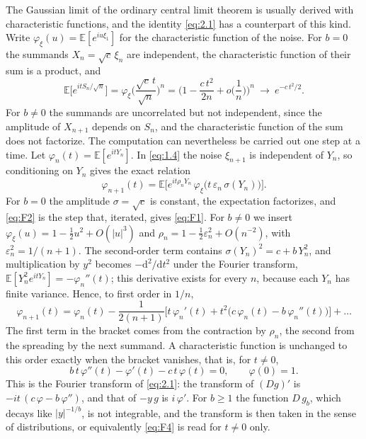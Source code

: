 \documentclass[aip,jmp,preprint,onecolumn,floatfix,superscriptaddress,nofootinbib,11pt]{revtex4-2}
\theoremstyle{plain}
\theoremstyle{remark}
\numberwithin{equation}{section}
\newcommand{\dd}{\mathrm{d}}
\newcommand{\E}{\mathbb{E}}
\newcommand{\eps}{\varepsilon}
\begin{document}
The Gaussian limit of the ordinary central limit theorem is usually derived with characteristic functions, and the identity \eqref{eq:2.1} has a counterpart of this kind. Write $\varphi_\xi(u)=\E[e^{iu\xi_1}]$ for the characteristic function of the noise. For $b=0$ the summands $X_n=\sqrt c\,\xi_n$ are independent, the characteristic function of their sum is a product, and
\begin{equation}
\E\big[e^{itS_n/\sqrt n}\big]=\varphi_\xi\Big(\frac{\sqrt c\,t}{\sqrt n}\Big)^{n}=\Big(1-\frac{c\,t^{2}}{2n}+o\Big(\frac1n\Big)\Big)^{n}\ \longrightarrow\ e^{-c\,t^{2}/2}.
\label{eq:F1}
\end{equation}
For $b\ne0$ the summands are uncorrelated but not independent, since the amplitude of $X_{n+1}$ depends on $S_n$, and the characteristic function of the sum does not factorize. The computation can nevertheless be carried out one step at a time. Let $\varphi_n(t)=\E[e^{itY_n}]$. In \eqref{eq:1.4} the noise $\xi_{n+1}$ is independent of $Y_n$, so conditioning on $Y_n$ gives the exact relation
\begin{equation}
\varphi_{n+1}(t)=\E\Big[e^{it\rho_nY_n}\,\varphi_\xi\big(t\,\eps_n\,\sigma(Y_n)\big)\Big].
\label{eq:F2}
\end{equation}
For $b=0$ the amplitude $\sigma=\sqrt c$ is constant, the expectation factorizes, and \eqref{eq:F2} is the step that, iterated, gives \eqref{eq:F1}. For $b\ne0$ we insert $\varphi_\xi(u)=1-\tfrac12u^{2}+O(|u|^{3})$ and $\rho_n=1-\tfrac12\eps_n^{2}+O(n^{-2})$, with $\eps_n^{2}=1/(n+1)$. The second-order term contains $\sigma(Y_n)^{2}=c+b\,Y_n^{2}$, and multiplication by $y^{2}$ becomes $-\dd^{2}/\dd t^{2}$ under the Fourier transform, $\E[Y_n^{2}e^{itY_n}]=-\varphi_n''(t)$; this derivative exists for every $n$, because each $Y_n$ has finite variance. Hence, to first order in $1/n$,
\begin{equation}
\varphi_{n+1}(t)=\varphi_n(t)-\frac{1}{2(n+1)}\Big[t\,\varphi_n'(t)+t^{2}\big(c\,\varphi_n(t)-b\,\varphi_n''(t)\big)\Big]+\dots
\label{eq:F3}
\end{equation}
The first term in the bracket comes from the contraction by $\rho_n$, the second from the spreading by the next summand. A characteristic function is unchanged to this order exactly when the bracket vanishes, that is, for $t\ne0$,
\begin{equation}
b\,t\,\varphi''(t)-\varphi'(t)-c\,t\,\varphi(t)=0,\qquad \varphi(0)=1 .
\label{eq:F4}
\end{equation}
This is the Fourier transform of \eqref{eq:2.1}: the transform of $(Dg)'$ is $-it\,(c\,\varphi-b\,\varphi'')$, and that of $-y\,g$ is $i\,\varphi'$. For $b\ge1$ the function $D\,g_b$, which decays like $|y|^{-1/b}$, is not integrable, and the transform is then taken in the sense of distributions, or equivalently \eqref{eq:F4} is read for $t\ne0$ only.
\end{document}
